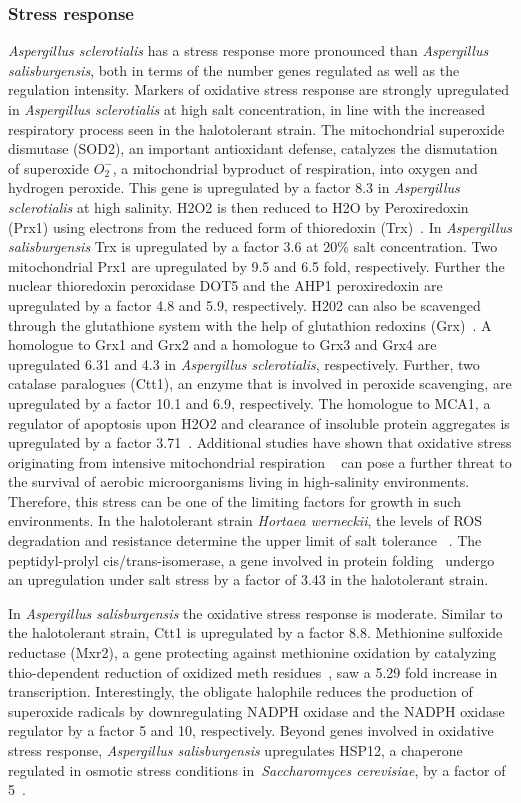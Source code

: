 \documentclass[jof,article,submit,moreauthors,pdftex,10pt,a4paper]{Definitions/mdpi}
\newcommand{\horWer}{\textit{Hortaea werneckii}}
\newcommand{\sacCer}{\textit{Saccharomyces cerevisiae}}
\newcommand{\phiSp}{\textit{Aspergillus salisburgensis}}
\newcommand{\phiScl}{\textit{Aspergillus sclerotialis}}
\begin{document}
\subsubsection{Stress response}
 \phiScl{} has a stress response more pronounced than \phiSp{}, both in terms of the number genes regulated as well as the regulation intensity.
 Markers of oxidative stress response are strongly upregulated in \phiScl{} at high salt concentration, in line with the increased respiratory process seen in the halotolerant strain. 
  The mitochondrial superoxide dismutase (SOD2), an important antioxidant defense, catalyzes the dismutation of superoxide $O_2^-$, a mitochondrial byproduct of respiration, into oxygen and hydrogen peroxide. This gene is upregulated by a factor 8.3 in \phiScl{} at high salinity. H2O2 is then reduced to H2O by Peroxiredoxin (Prx1) using electrons from the reduced form of thioredoxin (Trx)~\cite{Pannala2015}. In \phiSp{} Trx is upregulated by a factor 3.6 at 20$\%$ salt concentration. Two mitochondrial Prx1 are upregulated by 9.5 and 6.5 fold, respectively. Further the nuclear thioredoxin peroxidase DOT5 and the AHP1 peroxiredoxin are upregulated by a factor 4.8 and 5.9, respectively.  H202 can also be scavenged through the glutathione system with the help of glutathion redoxins (Grx)~\cite{Pannala2015}. A homologue to Grx1 and Grx2 and a homologue to Grx3 and Grx4 are upregulated 6.31 and 4.3 in \phiScl{}, respectively. Further, two catalase paralogues (Ctt1), an enzyme that is involved in peroxide scavenging, are upregulated by a factor 10.1 and 6.9, respectively. The homologue to MCA1, a regulator of apoptosis upon H2O2 and clearance of insoluble protein aggregates is upregulated by a factor 3.71~\cite{Madeo2002,Lee2010}. Additional studies have shown that oxidative stress originating from intensive mitochondrial respiration ~\cite{Gille1995} can pose a further threat to the survival of aerobic microorganisms living in high-salinity environments. Therefore, this stress can be one of the limiting factors for growth in such environments. In the halotolerant strain \horWer{}, the levels of ROS degradation and resistance determine the upper limit of salt tolerance ~\cite{Petrovic2006}.  The peptidyl-prolyl cis/trans-isomerase, a gene involved in protein folding~\cite{Guo2014} undergo an upregulation under salt stress by a factor of 3.43 in the halotolerant strain.

 
 In \phiSp{} the oxidative stress response is moderate. Similar to the halotolerant strain, Ctt1 is upregulated by a factor 8.8. Methionine sulfoxide reductase (Mxr2), a gene protecting against methionine oxidation by catalyzing thio-dependent reduction of oxidized meth residues~\cite{Stadtman2003}, saw a 5.29 fold increase in transcription. Interestingly, the obligate halophile reduces the production of superoxide radicals by downregulating NADPH oxidase and the NADPH oxidase regulator by a factor 5 and 10, respectively. Beyond genes involved in oxidative stress response, \phiSp{} upregulates HSP12, a chaperone regulated in osmotic stress conditions in~\sacCer{}, by a factor of 5~\cite{Saito2012}.  
\end{document}
